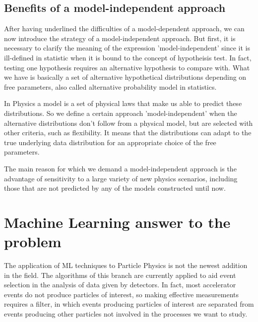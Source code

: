 \subsection{Benefits of a model-independent approach}
After having underlined the difficulties of a model-dependent approach, we can now introduce the strategy of a model-independent approach. But first, it is necessary to clarify the meaning of the expression 'model-independent' since it is ill-defined in statistic when it is bound to the concept of hypotheisis test. In fact, testing one hypothesis requires an alternative hypothesis to compare with. What we have is basically a set of alternative hypothetical distributions depending on free parameters, also called alternative probability model in statistics. 

In Physics a model is a set of physical laws that make us able to predict these distributions. So we define a certain approach 'model-independent' when the alternative distributions don't follow from a physical model, but are selected with other criteria, such as flexibility. It means that the distributions can adapt to the true underlying data distribution for an appropriate choice of the free parameters.

The main reason for which we demand a model-independent approach is the advantage of sensitivity to a large variety of new physics scenarios, including those that are not predicted by any of the models constructed until now.





\section{Machine Learning answer to the problem}
The application of ML techniques to Particle Physics is not the newest addition in the field. The algorithms of this branch are currently applied to aid event selection in the analysis of data given by detectors. In fact, most accelerator events do not produce particles of interest, so making effective measurements requires a filter, in which events producing particles of interest are separated from events producing other particles not involved in the processes we want to study.

